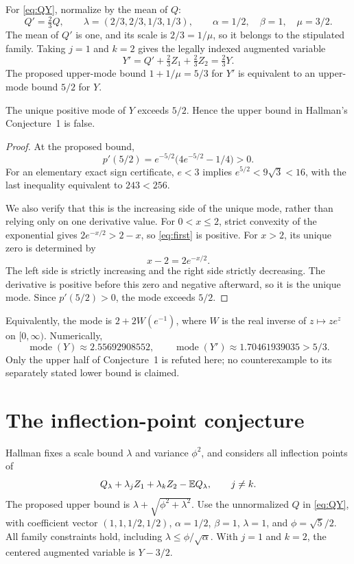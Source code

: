 \documentclass[11pt]{article}
\begin{document}
For \eqref{eq:QY}, normalize by the mean of $Q$:
\[
 Q'=\tfrac23Q,
 \qquad \lambda=(2/3,2/3,1/3,1/3),
 \qquad \alpha=1/2,\quad\beta=1,\quad\mu=3/2.
\]
The mean of $Q'$ is one, and its scale is $2/3=1/\mu$, so it belongs to the stipulated family. Taking $j=1$ and $k=2$ gives the legally indexed augmented variable
\[
 Y'=Q'+\tfrac23 Z_1+\tfrac23 Z_2=\tfrac23Y.
\]
The proposed upper-mode bound $1+1/\mu=5/3$ for $Y'$ is equivalent to an upper-mode bound $5/2$ for $Y$.

\begin{proposition}
The unique positive mode of $Y$ exceeds $5/2$. Hence the upper bound in Hallman's Conjecture~1 is false.
\end{proposition}
\begin{proof}
At the proposed bound,
\[
 p'(5/2)=e^{-5/2}\bigl(4e^{-5/2}-1/4\bigr)>0.
\]
For an elementary exact sign certificate, $e<3$ implies $e^{5/2}<9\sqrt3<16$, with the last inequality equivalent to $243<256$.

We also verify that this is the increasing side of the unique mode, rather than relying only on one derivative value. For $0<x\le2$, strict convexity of the exponential gives $2e^{-x/2}>2-x$, so \eqref{eq:first} is positive. For $x>2$, its unique zero is determined by
\[
 x-2=2e^{-x/2}.
\]
The left side is strictly increasing and the right side strictly decreasing. The derivative is positive before this zero and negative afterward, so it is the unique mode. Since $p'(5/2)>0$, the mode exceeds $5/2$.
\end{proof}

Equivalently, the mode is $2+2W(e^{-1})$, where $W$ is the real inverse of $z\mapsto ze^z$ on $[0,\infty)$. Numerically,
\[
 \operatorname{mode}(Y)\approx2.55692908552,
 \qquad\operatorname{mode}(Y')\approx1.70461939035>5/3.
\]
Only the upper half of Conjecture~1 is refuted here; no counterexample to its separately stated lower bound is claimed.

\section{The inflection-point conjecture}
Hallman \cite[Theorem~4 and Conjecture~2]{Hallman2024} fixes a scale bound $\lambda$ and variance $\phi^2$, and considers all inflection points of
\[
 Q_\lambda+\lambda_jZ_1+\lambda_kZ_2-\mathbb E Q_\lambda,
 \qquad j\ne k.
\]
The proposed upper bound is $\lambda+\sqrt{\phi^2+\lambda^2}$. Use the unnormalized $Q$ in \eqref{eq:QY}, with coefficient vector $(1,1,1/2,1/2)$, $\alpha=1/2$, $\beta=1$, $\lambda=1$, and $\phi=\sqrt5/2$. All family constraints hold, including $\lambda\le\phi/\sqrt\alpha$. With $j=1$ and $k=2$, the centered augmented variable is $Y-3/2$.
\end{document}
